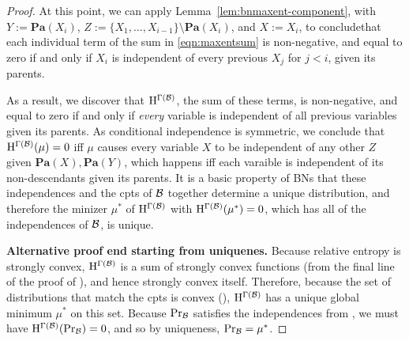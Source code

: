 \documentclass{article}
\def\Pa{\mathbf{Pa}}
\begin{document}
\begin{proof}
	At this point, we can apply Lemma~\ref{lem:bnmaxent-component},
	with $Y := \Pa(X_i)$, $Z := \{X_1, \ldots, X_{i-1}\} \setminus \Pa(X_i)$, and $X := X_i$, to conclude\footnotemark that each individual term of the sum in \eqref{eqn:maxentsum} is non-negative, and equal to zero if and only if $X_i$ is independent of every previous $X_j$ for $j < i$, given its parents. 
	
	
	As a result, we discover that $\mathrm{H}^{\Gamma(\mathcal B)}$, the sum of these terms, is non-negative, and equal to zero if and only if \emph{every} variable is independent of all previous variables given its parents. 
	As conditional independence is symmetric, we conclude that $\mathrm{H}^{\Gamma(\mathcal B)}(\mu) = 0$ iff $\mu$ causes every variable $X$ to be independent of any other $Z$ given $\Pa(X), \Pa(Y)$, which happens iff each varaible is independent of its non-descendants given its parents. It is a basic property of BNs that these independences and the cpts of $\cal B$ together determine a unique distribution, and therefore the minizer $\mu^*$ of $\mathrm{H}^{\Gamma(\mathcal B)}$ with $\mathrm{H}^{\Gamma(\mathcal B)}(\mu^*) = 0$, which has all of the independences of $\cal B$, is unique.
	
	
	\textbf{Alternative proof end starting from uniquenes.}	
	Because relative entropy is strongly convex, $\mathrm{H}^{\Gamma(\mathcal B)}$ is a sum of strongly convex functions (from the final line of the proof of ), and hence strongly convex itself. Therefore, because the set of distributions that match the cpts is convex (), $\mathrm{H}^{\Gamma(\mathcal B)}$ has a unique global minimum $\mu^*$ on this set. Because $\Pr_{\cal B}$ satisfies the independences from , we must have $\mathrm{H}^{\Gamma(\mathcal B)}(\Pr_{\cal B}) = 0$, and so by uniqueness, $\Pr_{\cal B} = \mu^*$.
\end{proof}

\clearpage
\end{document}
